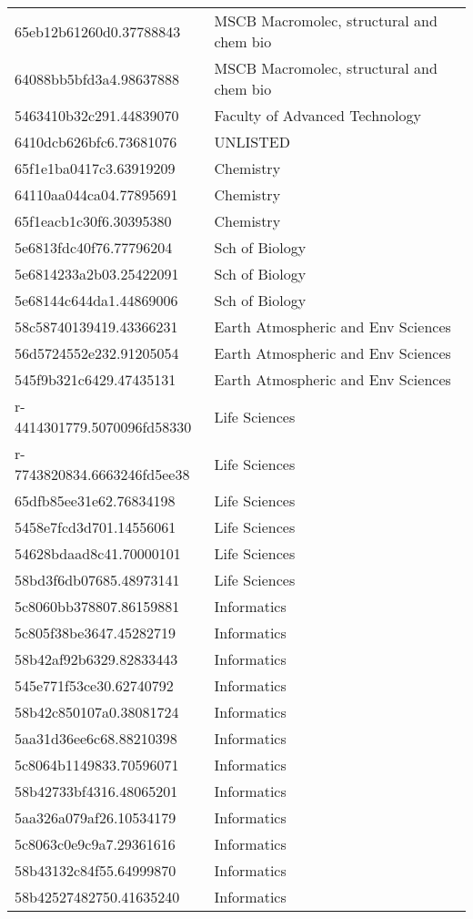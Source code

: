 \begin{tabular}{ll}
65eb12b61260d0.37788843 & MSCB Macromolec, structural and chem bio \\
64088bb5bfd3a4.98637888 & MSCB Macromolec, structural and chem bio \\
5463410b32c291.44839070 & Faculty of Advanced Technology \\
6410dcb626bfc6.73681076 & UNLISTED \\
65f1e1ba0417c3.63919209 & Chemistry \\
64110aa044ca04.77895691 & Chemistry \\
65f1eacb1c30f6.30395380 & Chemistry \\
5e6813fdc40f76.77796204 & Sch of Biology \\
5e6814233a2b03.25422091 & Sch of Biology \\
5e68144c644da1.44869006 & Sch of Biology \\
58c58740139419.43366231 & Earth Atmospheric and Env Sciences \\
56d5724552e232.91205054 & Earth Atmospheric and Env Sciences \\
545f9b321c6429.47435131 & Earth Atmospheric and Env Sciences \\
r-4414301779.5070096fd58330 & Life Sciences \\
r-7743820834.6663246fd5ee38 & Life Sciences \\
65dfb85ee31e62.76834198 & Life Sciences \\
5458e7fcd3d701.14556061 & Life Sciences \\
54628bdaad8c41.70000101 & Life Sciences \\
58bd3f6db07685.48973141 & Life Sciences \\
5c8060bb378807.86159881 & Informatics \\
5c805f38be3647.45282719 & Informatics \\
58b42af92b6329.82833443 & Informatics \\
545e771f53ce30.62740792 & Informatics \\
58b42c850107a0.38081724 & Informatics \\
5aa31d36ee6c68.88210398 & Informatics \\
5c8064b1149833.70596071 & Informatics \\
58b42733bf4316.48065201 & Informatics \\
5aa326a079af26.10534179 & Informatics \\
5c8063c0e9c9a7.29361616 & Informatics \\
58b43132c84f55.64999870 & Informatics \\
58b42527482750.41635240 & Informatics \\

\end{tabular}
